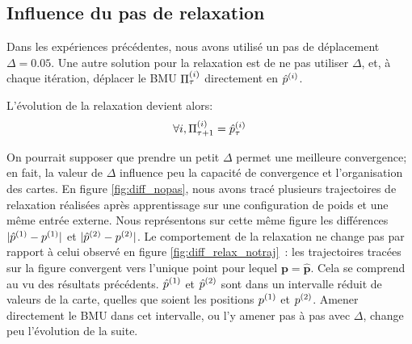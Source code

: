 \documentclass[../main]{subfiles}
\begin{document}
\subsection{Influence du pas de relaxation}

Dans les expériences précédentes, nous avons utilisé un pas de déplacement $\Delta=0.05$.
Une autre solution pour la relaxation est de ne pas utiliser $\Delta$, et, à chaque itération, déplacer le BMU $\Pi^{({i})}_\tau$ directement en $\hat{p}^{({i})}$.

L'évolution de la relaxation devient alors:
\begin{equation}
\forall i, \Pi^{({i})}_{\tau+1} = \hat{p}^{({i})}_{\tau}
\end{equation}

On pourrait supposer que prendre un petit $\Delta$ permet une meilleure convergence; en fait, la valeur de $\Delta$ influence peu la capacité de convergence et l'organisation des cartes.
En figure \ref{fig:diff_nopas}, nous avons tracé plusieurs trajectoires de relaxation réalisées après apprentissage sur une configuration de poids et une même entrée externe.
Nous représentons sur cette même figure les différences $\lvert \hat{p}^{({1})} - p^{({1})} \rvert$ et $\lvert \hat{p}^{({2})} - p^{({2})} \rvert$.
Le comportement de la relaxation ne change pas par rapport à celui observé en figure \ref{fig:diff_relax_notraj}~: les trajectoires tracées sur la figure convergent vers l'unique point pour lequel $\mathbf{p} = \mathbf{\hat{p}}$.
Cela se comprend au vu des résultats précédents. $\hat{p}^{({1})}$ et $\hat{p}^{({2})}$ sont dans un intervalle réduit de valeurs de la carte, quelles que soient les positions $p^{({1})}$ et $p^{({2})}$. 
Amener directement le BMU dans cet intervalle, ou l'y amener pas à pas avec $\Delta$, change peu l'évolution de la suite. 
\end{document}

